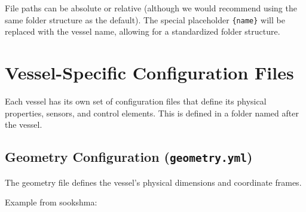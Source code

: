\documentclass[
  letterpaper,
  DIV=11,
  numbers=noendperiod]{scrreprt}
\begin{document}
File paths can be absolute or relative (although we would recommend
using the same folder structure as the default). The special placeholder
\texttt{\{name\}} will be replaced with the vessel name, allowing for a
standardized folder structure.

\section*{Vessel-Specific Configuration
Files}\label{vessel-specific-configuration-files}


Each vessel has its own set of configuration files that define its
physical properties, sensors, and control elements. This is defined in a
folder named after the vessel.

\subsection*{\texorpdfstring{Geometry Configuration
(\texttt{geometry.yml})}{Geometry Configuration (geometry.yml)}}\label{geometry-configuration-geometry.yml}

The geometry file defines the vessel's physical dimensions and
coordinate frames.

Example from sookshma:
\end{document}
